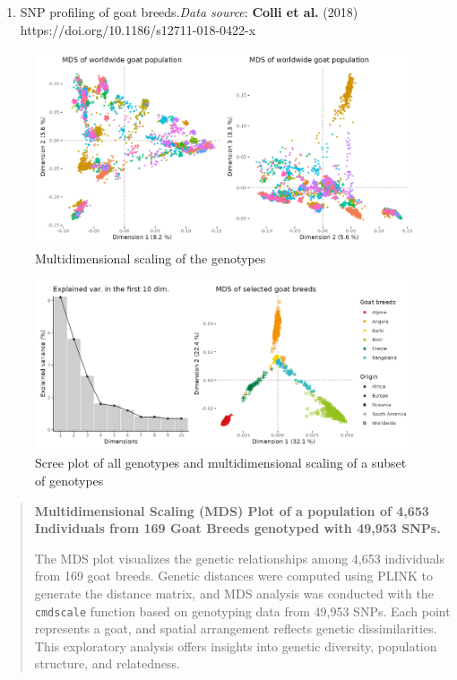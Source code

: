 \begin{enumerate}
  \def\labelenumi{\arabic{enumi}.}
  \tightlist
  \item
        SNP profiling of goat breeds.\emph{Data source}: \textbf{Colli et al.}
        (2018) https://doi.org/10.1186/s12711-018-0422-x
\end{enumerate}

\begin{figure}
  \centering
  \includegraphics[width=\linewidth]{Figures/goat_mds_12.png}
  \caption{Multidimensional scaling of the genotypes}
\end{figure}

\begin{figure}
  \centering
  \includegraphics[width=\linewidth]{Figures/goat_mds_eigen_filter.png}
  \caption{Scree plot of all genotypes and multidimensional scaling of a
    subset of genotypes}
\end{figure}

\begin{quote}
  \textbf{Multidimensional Scaling (MDS) Plot of a population of 4,653
    Individuals from 169 Goat Breeds genotyped with 49,953 SNPs.}

  The MDS plot visualizes the genetic relationships among 4,653 individuals
  from 169 goat breeds. Genetic distances were computed using PLINK to
  generate the distance matrix, and MDS analysis was conducted with the
  \texttt{cmdscale} function based on genotyping data from 49,953 SNPs.
  Each point represents a goat, and spatial arrangement reflects genetic
  dissimilarities. This exploratory analysis offers insights into genetic
  diversity, population structure, and relatedness.
\end{quote}

